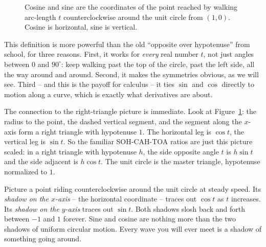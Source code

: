\begin{figure}[H]
\centering
{}
\caption{Cosine and sine are the coordinates of the point reached by walking arc-length $t$ counterclockwise around the unit circle from $(1,0)$. Cosine is horizontal, sine is vertical.}
\label{ch04:fig-unitcircle}
\end{figure}

This definition is more powerful than the old ``opposite over hypotenuse'' from school, for three reasons. First, it works for \emph{every} real number $t$, not just angles between $0$ and $90^\circ$: keep walking past the top of the circle, past the left side, all the way around and around. Second, it makes the symmetries obvious, as we will see. Third -- and this is the payoff for calculus -- it ties $\sin$ and $\cos$ directly to motion along a curve, which is exactly what derivatives are about.

The connection to the right-triangle picture is immediate. Look at Figure~\ref{ch04:fig-unitcircle}: the radius to the point, the dashed vertical segment, and the segment along the $x$-axis form a right triangle with hypotenuse $1$. The horizontal leg is $\cos t$, the vertical leg is $\sin t$. So the familiar SOH-CAH-TOA ratios are just this picture scaled: in a right triangle with hypotenuse $h$, the side opposite angle $t$ is $h\sin t$ and the side adjacent is $h\cos t$. The unit circle is the master triangle, hypotenuse normalized to $1$.

\begin{intuitionbox}
Picture a point riding counterclockwise around the unit circle at steady speed. Its \emph{shadow on the $x$-axis} -- the horizontal coordinate -- traces out $\cos t$ as $t$ increases. Its \emph{shadow on the $y$-axis} traces out $\sin t$. Both shadows slosh back and forth between $-1$ and $1$ forever. Sine and cosine are nothing more than the two shadows of uniform circular motion. Every wave you will ever meet is a shadow of something going around.
\end{intuitionbox}

